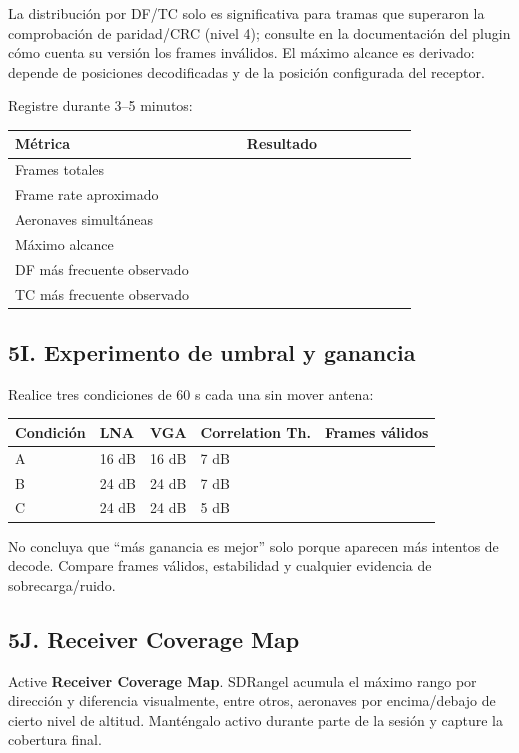 La distribución por DF/TC solo es significativa para tramas que superaron la comprobación de paridad/CRC (nivel 4); consulte en la documentación del plugin cómo cuenta su versión los frames inválidos. El máximo alcance es derivado: depende de posiciones decodificadas y de la posición configurada del receptor.

Registre durante 3--5 minutos:

\begin{longtable}{@{}p{0.46\linewidth}p{0.34\linewidth}@{}}
\toprule
Métrica & Resultado \\
\midrule
\endhead
Frames totales & \\
Frame rate aproximado & \\
Aeronaves simultáneas & \\
Máximo alcance & \\
DF más frecuente observado & \\
TC más frecuente observado & \\
\bottomrule
\end{longtable}

\subsection{5I. Experimento de umbral y ganancia}

Realice tres condiciones de 60 s cada una sin mover antena:

\begin{longtable}{@{}lllll@{}}
\toprule
Condición & LNA & VGA & Correlation Th. & Frames válidos \\
\midrule
A & 16 dB & 16 dB & 7 dB & \\
B & 24 dB & 24 dB & 7 dB & \\
C & 24 dB & 24 dB & 5 dB & \\
\bottomrule
\end{longtable}

No concluya que ``más ganancia es mejor'' solo porque aparecen más intentos de decode. Compare frames válidos, estabilidad y cualquier evidencia de sobrecarga/ruido.

\subsection{5J. Receiver Coverage Map}

Active \textbf{Receiver Coverage Map}. SDRangel acumula el máximo rango por dirección y diferencia visualmente, entre otros, aeronaves por encima/debajo de cierto nivel de altitud. Manténgalo activo durante parte de la sesión y capture la cobertura final.

